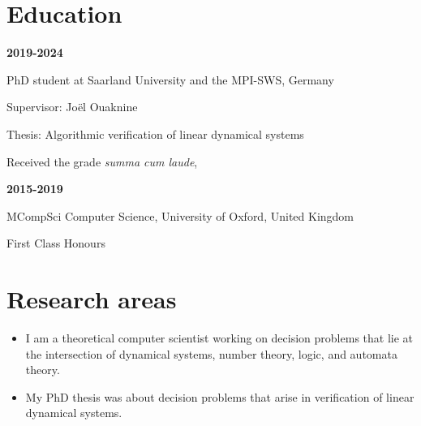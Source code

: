 \documentclass{article}
\begin{document}
	\section*{Education}
		\begin{minipage}{0.3\textwidth}
			\hspace{0.5cm} \textbf{2019-2024}
		\end{minipage}
		\vspace*{0.25cm}
		\begin{minipage}{0.7\textwidth}
			PhD student at Saarland University and the MPI-SWS, Germany
			
			\vspace*{0.2cm}
			Supervisor: Jo\"el Ouaknine 
			
			\vspace*{0.2cm}
			Thesis: Algorithmic verification of linear dynamical systems
			
			\vspace*{0.2cm}
			Received the grade \emph{summa cum laude},
                \vspace{0.3cm}
		\end{minipage}
		\vspace{0.85cm}
		\begin{minipage}{0.3\textwidth}
		\hspace{0.5cm} \textbf{2015-2019}
	\end{minipage}
	\begin{minipage}{0.7\textwidth}
		MCompSci Computer Science, University of Oxford, United Kingdom
		
		\vspace*{0.2cm}
		First Class Honours
	\end{minipage}
	\section*{Research areas}
	\begin{itemize}
		\item I am a theoretical computer scientist working on decision problems that lie at the intersection of dynamical systems, number theory, logic, and automata theory.
		\item My PhD thesis was about decision problems that arise in verification of linear dynamical systems.
	\end{itemize}
	
\end{document}
